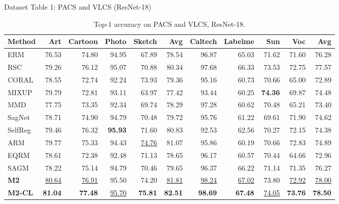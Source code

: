 \documentclass[t, aspectratio=169]{beamer} %
\begin{document}
	


	\begin{frame}{Dataset Table 1: PACS and VLCS (ResNet-18)}
\begin{table}[htbp]
\centering
\caption{Top-1 accuracy on PACS and VLCS, ResNet-18.}
\scriptsize
\begin{adjustbox}{max width=\textwidth}
\begin{tabular}{lrrrrrrrrrr}
\toprule
Method & Art & Cartoon & Photo & Sketch & Avg & Caltech & Labelme & Sun & Voc & Avg \\
\midrule
ERM & 76.53 & 74.80 & 94.95 & 67.89 & 78.54 & 96.87 & 65.03 & 71.62 & 71.60 & 76.28 \\
RSC & 79.26 & 76.12 & 95.07 & 70.88 & 80.34 & 97.68 & 66.33 & 73.53 & 72.75 & 77.57 \\
CORAL & 78.55 & 72.74 & 92.24 & 73.93 & 79.36 & 95.16 & 60.73 & 70.66 & 65.00 & 72.89 \\
MIXUP & 79.79 & 72.81 & 93.11 & 63.97 & 77.42 & 93.44 & 60.25 & \textbf{74.36} & 69.87 & 74.48 \\
MMD & 77.75 & 73.35 & 92.34 & 69.74 & 78.29 & 97.28 & 60.62 & 70.48 & 65.21 & 73.40 \\
SagNet & 78.71 & 74.90 & 94.79 & 70.48 & 79.72 & 95.76 & 61.22 & 69.61 & 71.90 & 74.62 \\
SelfReg & 79.46 & 76.32 & \textbf{95.93} & 71.60 & 80.83 & 92.53 & 62.56 & 70.27 & 72.15 & 74.38 \\
ARM & 79.77 & 75.33 & 94.43 & \underline{74.76} & 81.07 & 95.86 & 60.19 & 70.66 & 72.83 & 74.89 \\
EQRM & 78.61 & 72.38 & 92.48 & 71.13 & 78.65 & 96.17 & 60.57 & 70.44 & 64.66 & 72.96 \\
SAGM & 78.22 & 75.14 & 94.79 & 70.46 & 79.65 & 96.37 & 66.22 & 71.14 & 71.35 & 76.27 \\
\midrule
\textbf{M2} & \underline{80.64} & \underline{76.91} & 95.50 & 74.20 & \underline{81.81} & \underline{98.24} & \underline{67.02} & 73.80 & \underline{72.92} & \underline{78.00} \\
\textbf{M2-CL} & \textbf{81.04} & \textbf{77.48} & \underline{95.70} & \textbf{75.81} & \textbf{82.51} & \textbf{98.69} & \textbf{67.48} & \underline{74.05} & \textbf{73.76} & \textbf{78.50} \\
\bottomrule
\end{tabular}
\end{adjustbox}
\end{table}
	\end{frame}
\end{document}

